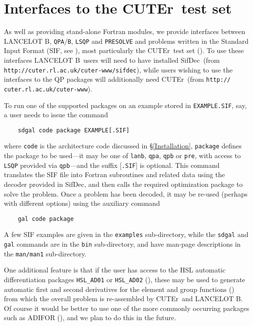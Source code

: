 \documentclass[twoside]{article}
\newcommand{\lanb}{{\sf LANCELOT B}}
\newcommand{\cuter}{{\sf CUTEr}}
\newcommand{\sifdec}{{\sf SifDec}}
\begin{document}
\section{Interfaces to the \cuter\ test set}

As well as providing stand-alone Fortran modules, we provide 
interfaces between \lanb, {\tt QPA}/{\tt B}, {\tt LSQP} and {\tt PRESOLVE} and
problems written in the Standard Input Format (SIF, see
), most particularly
the \cuter\ test set (). To use these
interfaces \lanb\ users will need to have installed
\sifdec\ (from {\tt http://cuter.rl.ac.uk/cuter-www/sifdec}), 
while users wishing to use the interfaces to the QP packages 
will additionally need \cuter\
(from  {\tt http:// cuter.rl.ac.uk/cuter-www}).

To run one of the supported packages on an example stored in
{\tt EXAMPLE.SIF}, say, a user needs to issue the command
\begin{verbatim}
    sdgal code package EXAMPLE[.SIF] 
\end{verbatim}
where {\tt code} is the architecture code discussed in \S\ref{Installation},
{\tt package} defines the package to be used---it may be one of {\tt lanb},
{\tt qpa}, {\tt qpb} or {\tt pre}, with access to {\tt LSQP} 
provided via {\tt qpb}---and the suffix [{\tt .SIF}] is optional.
This command translates the SIF file into Fortran subroutines and 
related data using the decoder provided in \sifdec, and then calls
the required optimization package to solve the problem. Once a problem
has been decoded, it may be re-used (perhaps with different options)
using the auxiliary command
\begin{verbatim}
    gal code package 
\end{verbatim}
A few SIF examples are given in the {\tt examples} sub-directory, while the
{\tt sdgal} and {\tt gal} commands are in the {\tt bin} sub-directory, and
have man-page descriptions in the {\tt man/man1} sub-directory.

One additional feature is that if the user has
access to the HSL automatic differentiation packages {\tt HSL\_AD01} 
or {\tt HSL\_AD02} (\bciteb{PrycReid98}), 
these may be used to generate automatic first and second derivatives
for the element and group functions (\bciteb{ConnGoulToin92}) 
from which the overall problem is re-assembled by \cuter\ and \lanb.
Of course it would be better to use one of the more 
commonly occurring packages 
such as  ADIFOR (),
and we plan to do this in the future.
\end{document}
